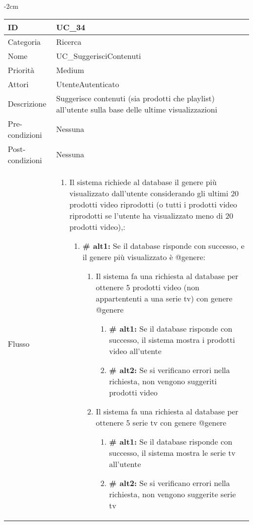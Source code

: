 \begin{center}
\begin{table}[bp]
    \centering
    \addtolength{\leftskip} {-2cm}
    \vspace{-4.35cm}
\begin{tabular}{ |p{2.6cm}|p{13cm}|  }
\hline
ID & UC\_34 \\\hline
Categoria & Ricerca \\\hline
Nome & UC\_SuggerisciContenuti\\\hline
Priorità & Medium \\\hline
Attori &  UtenteAutenticato \\\hline
Descrizione & Suggerisce contenuti (sia prodotti che playlist) all'utente sulla base delle ultime visualizzazioni\\\hline
Pre-condizioni &  Nessuna\\\hline
Post-condizioni &  Nessuna\\\hline
Flusso &  	\vspace{-5mm} \begin{enumerate}
		\item Il sistema richiede al database il genere più visualizzato dall'utente considerando gli ultimi 20 prodotti video riprodotti (o tutti i prodotti video riprodotti se l'utente ha visualizzato meno di 20 prodotti video),:
		\begin{enumerate}[label*=\arabic*.]
			\item \textbf{\# alt1:} Se il database risponde con successo, e il genere più visualizzato è @genere:
			\begin{enumerate}[label*=\arabic*.]
			\item Il sistema fa una richiesta al database per ottenere 5 prodotti video (non appartententi a una serie tv) con genere @genere
				\begin{enumerate}[label*=\arabic*.]
					\item \textbf{\# alt1:} Se il database risponde con successo, il sistema mostra i prodotti video all'utente
					\item \textbf{\# alt2:} Se si verificano errori nella richiesta, non vengono suggeriti prodotti video
				\end{enumerate}
			\item Il sistema fa una richiesta al database per ottenere 5 serie tv con genere @genere
				\begin{enumerate}[label*=\arabic*.]
					\item \textbf{\# alt1:} Se il database risponde con successo, il sistema mostra le serie tv all'utente
					\item \textbf{\# alt2:} Se si verificano errori nella richiesta, non vengono suggerite serie tv

\end{enumerate}
\end{enumerate}
\end{enumerate}
\end{enumerate}
\end{tabular}
\end{table}
\end{center}
